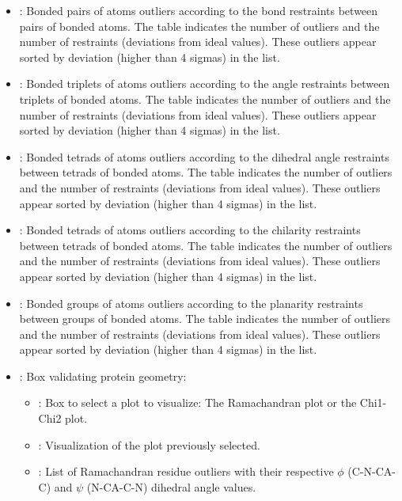 \begin{itemize}
\begin{itemize}
\begin{itemize}
         \item {}: Bonded pairs of atoms outliers   according to the bond restraints between pairs of bonded atoms. The  table indicates the number of outliers and the number of restraints (deviations from ideal values). These outliers appear sorted by deviation (higher than 4 sigmas) in the  list.
         \item {}: Bonded triplets of atoms outliers according to the angle restraints between triplets of bonded atoms. The  table indicates the number of outliers and the number of restraints (deviations from ideal values). These outliers appear sorted by deviation (higher than 4 sigmas) in the  list.
         \item {}: Bonded tetrads of atoms outliers  according to the dihedral angle restraints between tetrads of bonded atoms. The  table indicates the number of outliers and the number of restraints (deviations from ideal values). These outliers appear sorted by deviation (higher than 4 sigmas) in the  list.
         \item {}: Bonded tetrads of atoms outliers according to the chilarity restraints between tetrads of bonded atoms. The  table indicates the number of outliers and the number of restraints (deviations from ideal values). These outliers appear sorted by deviation (higher than 4 sigmas) in the  list.
         \item {}: Bonded groups of atoms outliers according to the planarity restraints between groups of bonded atoms. The  table indicates the number of outliers and the number of restraints (deviations from ideal values). These outliers appear sorted by deviation (higher than 4 sigmas) in the  list.
         \item {}: Box validating protein geometry:
         \begin{itemize}
          \item {}: Box to select a plot to visualize: The Ramachandran plot or the Chi1-Chi2 plot.
          \item {}: Visualization of the plot previously selected.
          \item {}: List of Ramachandran residue outliers with their respective $\phi$ (C-N-CA-C) and $\psi$ (N-CA-C-N) dihedral angle values.

\end{itemize}
\end{itemize}
\end{itemize}
\end{itemize}
